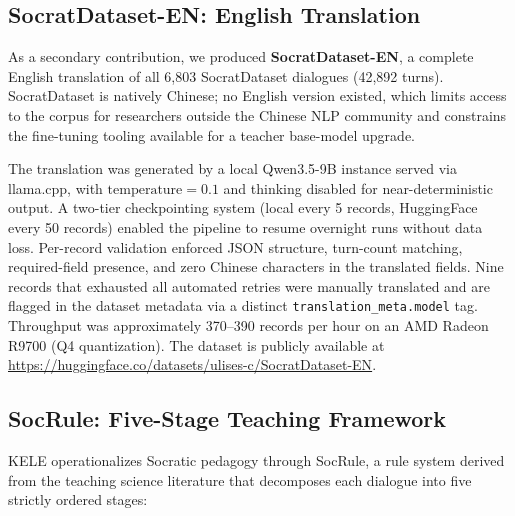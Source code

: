 \documentclass[11pt]{article}
\begin{document}
\subsection{SocratDataset-EN: English Translation}
\label{sec:dataset-en}

As a secondary contribution, we produced \textbf{SocratDataset-EN}, a complete English translation of all 6,803 SocratDataset dialogues (42,892 turns). SocratDataset is natively Chinese; no English version existed, which limits access to the corpus for researchers outside the Chinese NLP community and constrains the fine-tuning tooling available for a teacher base-model upgrade.

The translation was generated by a local Qwen3.5-9B instance served via llama.cpp, with $\text{temperature}=0.1$ and thinking disabled for near-deterministic output. A two-tier checkpointing system (local every 5 records, HuggingFace every 50 records) enabled the pipeline to resume overnight runs without data loss. Per-record validation enforced JSON structure, turn-count matching, required-field presence, and zero Chinese characters in the translated fields. Nine records that exhausted all automated retries were manually translated and are flagged in the dataset metadata via a distinct \texttt{translation\_meta.model} tag. Throughput was approximately 370--390 records per hour on an AMD Radeon R9700 (Q4 quantization). The dataset is publicly available at \url{https://huggingface.co/datasets/ulises-c/SocratDataset-EN}.

\subsection{SocRule: Five-Stage Teaching Framework}

KELE operationalizes Socratic pedagogy through SocRule, a rule system derived from the teaching science literature \citep{trowbridge2011teaching} that decomposes each dialogue into five strictly ordered stages:
\end{document}
